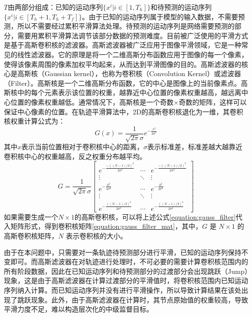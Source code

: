 $T$由两部分组成：已知的运动序列$\{x^i|i\in[1,T_h]\}$和待预测的运动序列$\{x^i|i\in[T_h+1,T_h+T_f]\}$。由于已知的运动序列属于模型的输入数据，不需要预测，所以不需要经过累积平滑算法处理。待预测的运动序列是网络需要预测的部分，需要用累积平滑算法调节该部分数据的预测难度。目前被广泛使用的平滑方式是基于高斯卷积核的滤波器。高斯滤波器被广泛应用于图像平滑领域，它是一种常见的线性滤波器。它的原理是将一个二维高斯分布函数应用于图像的每一个像素，使得该像素周围的像素加权平均起来，从而达到平滑图像的目的。高斯滤波器的核心是高斯核（Gaussian kernel），也称为卷积核（Convolution Kernel）或滤波器（Filter）。高斯核是一个二维高斯分布函数，它的中心是图像上的当前像素点。高斯核中的每个元素表示该位置的权重，越靠近中心位置的像素权重越高，越远离中心位置的像素权重越低。通常情况下，高斯核是一个奇数×奇数的矩阵，这样可以保证中心像素的位置。在轨迹平滑算法中，2D的高斯卷积核退化为一维，其卷积核权重计算公式为：
\begin{equation}
    G(x) = \frac{1}{\sqrt{2\pi}\sigma}e^{-\frac{x^2}{2\sigma^2}}
    \label{equation:gauss_filter}
\end{equation}
其中$x$表示当前位置相对于卷积核中心的距离，$\sigma$表示标准差，标准差越大越靠近卷积核中心的权重越高，反之权重分布越平均。
\begin{equation}
    G = \frac{1}{\sqrt{2\pi}\sigma}
        \begin{bmatrix}e^{-\frac{-{((N-1)/2)} ^2}{2\sigma^2}} & \cdots & e^{-\frac{-{((N-1)/2)}^2}{2\sigma^2}} \\ 
        \vdots & \ddots & \vdots \\
        e^{-\frac{0^2}{2\sigma^2}} & \cdots & e^{-\frac{0^2}{2\sigma^2}} \\
        \vdots & \ddots & \vdots \\
        e^{-\frac{{((N-1)/2)}^2}{2\sigma^2}} & \cdots & e^{-\frac{{((N-1)/2)}^2}{2\sigma^2}
        }\end{bmatrix}
    \label{equation:gauss_filter_mat}
\end{equation}
如果需要生成一个$N\times 1$的高斯卷积核，可以将上述公式\ref{equation:gauss_filter}代入矩阵形式，得到卷积核矩阵\ref{equation:gauss_filter_mat}，其中，$G$ 是 $N\times 1$ 的高斯卷积核矩阵，$N$ 表示卷积核的大小。

由于在本问题中，只需要对一条轨迹待预测部分进行平滑，已知的运动序列保持不变即可。而高斯滤波器在对轨迹进行处理时，不可必要的需要计算卷积核范围内的所有阶段数据，因此在已知运动序列和待预测部分的过渡部分会出现跳跃（Jump）现象，这是由于高斯滤波器在计算过渡部分的平滑值时，将卷积核范围内已知运动序列纳入计算。而已知运动序列并没有进行平滑操作，所以导致计算结果在该处出现了跳跃现象。此外，由于高斯滤波器在计算时，其节点原始值的权重较高，导致平滑力度不足，难以构造层次化的中级监督目标。

